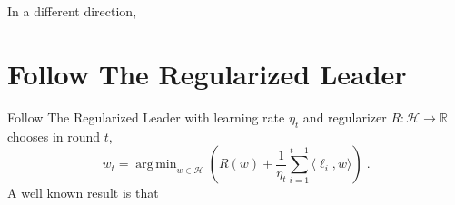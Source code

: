 \documentclass{colt2016} %
\newcommand{\R}{\mathbb{R}}     %
\renewcommand{\H}{\mathcal{H}}  %
\DeclareMathOperator*{\argmin}{arg\,min}
\begin{document}
In a different direction,

\appendix

\section{Follow The Regularized Leader}

Follow The Regularized Leader with learning rate $\eta_t$ and regularizer $R:\H \to \R$
chooses in round $t$,
$$
w_t = \argmin_{w \in \H} \left( R(w) + \frac{1}{\eta_t} \sum_{i=1}^{t-1} \langle \ell_i, w \rangle \right) \; .
$$
A well known result is that
\end{document}
